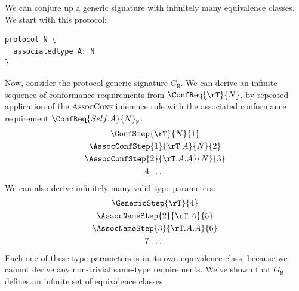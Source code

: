 \documentclass[../generics]{subfiles}
\begin{document}
\begin{example}\label{protocol n example}
We can conjure up a generic signature with infinitely many equivalence classes. We start with this protocol:
\begin{Verbatim}
protocol N {
  associatedtype A: N
}
\end{Verbatim}
Now, consider the protocol generic signature $G_\texttt{N}$. We can derive an infinite sequence of conformance requirements from $\ConfReq{\rT}{N}$, by repeated application of the \textsc{AssocConf} inference rule with the associated conformance requirement $\ConfReq{Self.A}{N}_\texttt{N}$:
\begin{gather*}
\ConfStep{\rT}{N}{1}\\
\AssocConfStep{1}{\rT.A}{N}{2}\\
\AssocConfStep{2}{\rT.A.A}{N}{3}\\
4.\ \ldots
\end{gather*}
We can also derive infinitely many valid type parameters:
\begin{gather*}
\GenericStep{\rT}{4}\\
\AssocNameStep{2}{\rT.A}{5}\\
\AssocNameStep{3}{\rT.A.A}{6}\\
7.\ \ldots
\end{gather*}
Each one of these type parameters is in its own equivalence class, because we cannot derive any non-trivial same-type requirements. We've shown that $G_\texttt{N}$ defines an infinite set of equivalence classes.
\end{example}
\end{document}
